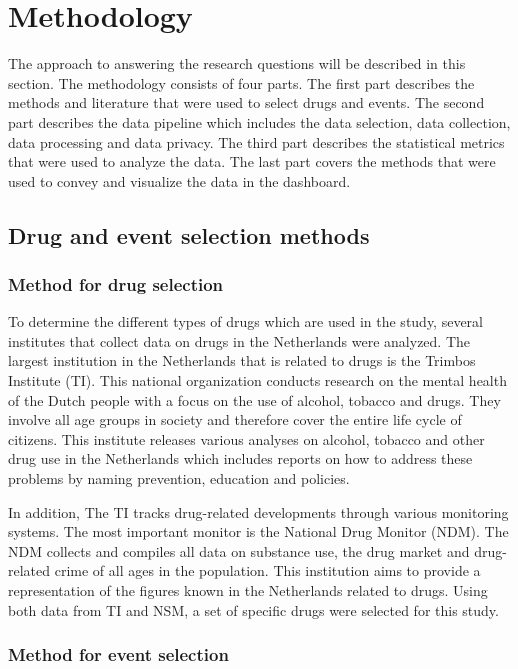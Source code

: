 \section {Methodology}

The approach to answering the research questions will be described in this section. The methodology consists of four parts. The first part describes the methods and literature that were used to select drugs and events. The second part describes the data pipeline which includes the data selection, data collection, data processing and data privacy. The third part describes the statistical metrics that were used to analyze the data. The last part covers the methods that were used to convey and visualize the data in the dashboard. 

\subsection {Drug and event selection methods}

\subsubsection {Method for drug selection}

To determine the different types of drugs which are used in the study, several institutes that collect data on drugs in the Netherlands were analyzed. The largest institution in the Netherlands that is related to drugs is the Trimbos Institute (TI). This national organization conducts research on the mental health of the Dutch people with a focus on the use of alcohol, tobacco and drugs. They involve all age groups in society and therefore cover the entire life cycle of citizens. This institute releases various analyses on alcohol, tobacco and other drug use in the Netherlands which includes reports on how to address these problems by naming prevention, education and policies. 

In addition, The TI tracks drug-related developments through various monitoring systems. The most important monitor is the National Drug Monitor (NDM). The NDM collects and compiles all data on substance use, the drug market and drug-related crime of all ages in the population. This institution aims to provide a representation of the figures known in the Netherlands related to drugs. Using both data from TI and NSM, a set of specific drugs were selected for this study. 


\subsubsection {Method for event selection}

